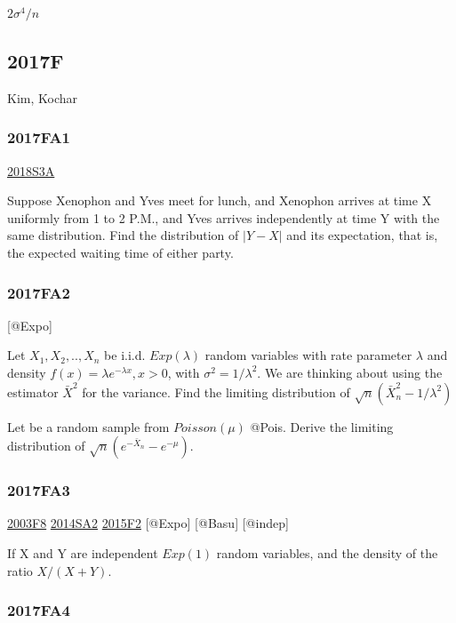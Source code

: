 \documentclass[6pt,Portrait]{article}
\begin{document}
\(2\sigma^4/n\)

\hypertarget{f-12}{%
\subsection{2017F}\label{f-12}}

Kim, Kochar

\hypertarget{fa1-3}{%
\subsubsection{2017FA1}\label{fa1-3}}

\protect\hyperlink{s3a-2}{2018S3A}

Suppose Xenophon and Yves meet for lunch, and Xenophon arrives at time X
uniformly from 1 to 2 P.M., and Yves arrives independently at time Y
with the same distribution. Find the distribution of \(|Y-X|\) and its
expectation, that is, the expected waiting time of either party.

\hypertarget{fa2-3}{%
\subsubsection{2017FA2}\label{fa2-3}}

{[}@Expo{]}

Let \(X_1,X_2,..,X_n\) be i.i.d. \(Exp(\lambda)\) random variables with
rate parameter \(\lambda\) and density
\(f(x)=\lambda e^{-\lambda x}, x>0\), with \(\sigma^2=1/\lambda^2\). We
are thinking about using the estimator \(\bar X^2\) for the variance.
Find the limiting distribution of \(\sqrt{n}(\bar X_n^2-1/\lambda^2)\)

Let be a random sample from \(Poisson(\mu)\) @Pois. Derive the limiting
distribution of \(\sqrt{n}(e^{-\bar X_n}-e^{-\mu})\).

\hypertarget{fa3-3}{%
\subsubsection{2017FA3}\label{fa3-3}}

\protect\hyperlink{f8-1}{2003F8} \protect\hyperlink{sa2-2}{2014SA2}
\protect\hyperlink{f2-5}{2015F2} {[}@Expo{]} {[}@Basu{]} {[}@indep{]}

If X and Y are independent \(Exp(1)\) random variables, and the density
of the ratio \(X/(X+Y)\).

\hypertarget{fa4-3}{%
\subsubsection{2017FA4}\label{fa4-3}}
\end{document}
